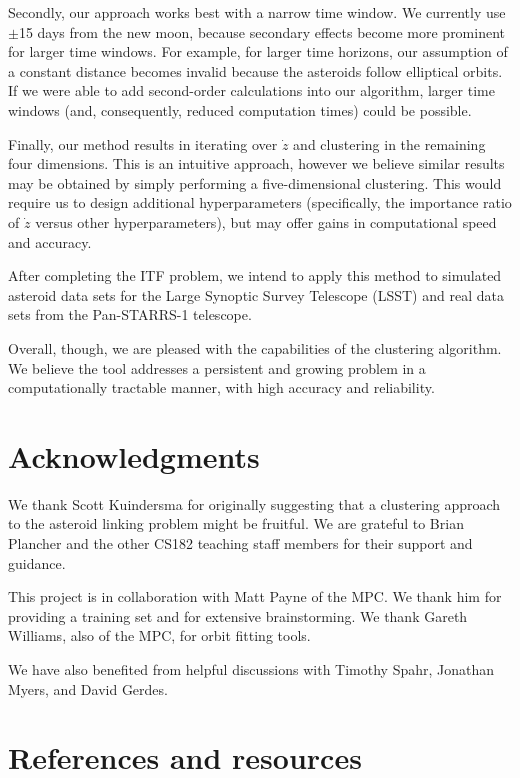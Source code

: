 \documentclass[11pt,letter]{article}
\begin{document}
    Secondly, our approach works best with a narrow time window.  We currently use $\pm$15 days from the new moon, because secondary effects become more prominent for larger time windows.  For example, for larger time horizons, our assumption of a constant distance becomes invalid because the asteroids follow elliptical orbits.  If we were able to add second-order calculations into our algorithm, larger time windows (and, consequently, reduced computation times) could be possible.

    Finally, our method results in iterating over $\dot{z}$ and clustering in the remaining four dimensions.  This is an intuitive approach, however we believe similar results may be obtained by simply performing a five-dimensional clustering.  This would require us to design additional hyperparameters (specifically, the importance ratio of $\dot{z}$ versus other hyperparameters), but may offer gains in computational speed and accuracy.

    After completing the ITF problem, we intend to apply this method to simulated asteroid data sets for the Large Synoptic Survey Telescope (LSST) and real data sets from the Pan-STARRS-1 telescope.

    Overall, though, we are pleased with the capabilities of the clustering algorithm.  We believe the tool addresses a persistent and growing problem in a computationally tractable manner, with high accuracy and reliability.  

\section*{Acknowledgments}

We thank Scott Kuindersma for originally suggesting that a clustering approach to the asteroid linking problem might be fruitful.  We are grateful to Brian Plancher and the other CS182 teaching staff members for their support and guidance.  

This project is in collaboration with Matt Payne of the MPC.  We thank him for providing a training set and for extensive brainstorming.  We thank Gareth Williams, also of the MPC, for orbit fitting tools.  

We have also benefited from helpful discussions with Timothy Spahr, Jonathan Myers, and David Gerdes.

\section*{References and resources}
\end{document}
